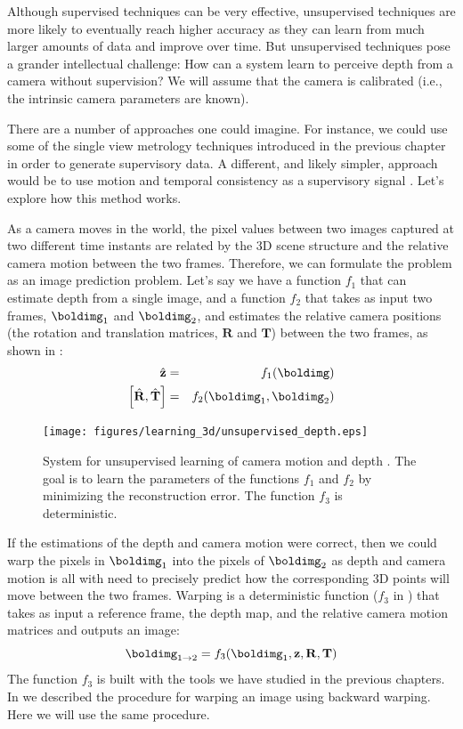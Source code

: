 Although supervised techniques can be very effective, unsupervised techniques are more likely to eventually reach higher accuracy as they can learn from much larger amounts of data and improve over time. But unsupervised techniques pose a grander intellectual challenge: How can a system learn to perceive depth from a camera without supervision? We will assume that the camera is calibrated (i.e., the intrinsic camera parameters are known).

There are a number of approaches one could imagine. For instance, we could use some of the single view metrology techniques introduced in the previous chapter in order to generate supervisory data. A different, and likely simpler, approach would be to use motion and temporal consistency as a supervisory signal \cite{Tinghui2017}. Let's explore how this method works. 

As a camera moves in the world, the pixel values between two images captured at two different time instants are related by the 3D scene structure and the relative camera motion between the two frames. Therefore, we can formulate the problem as an image prediction problem.
Let's say we have a function $f_1$ that can estimate depth from a single image, and a function $f_2$ that takes as input two frames, $\boldimg_1$ and $\boldimg_2$, and estimates the relative camera positions (the rotation and translation matrices, $\mathbf{R}$ and $\mathbf{T}$) between the two frames, as shown in \fig{\ref{fig:unsupervised_depth_system}}: 
\begin{eqnarray}
\hat{\mathbf{z}} &=& f_1(\boldimg) \\
\left[ \hat{\mathbf{R}},\hat{\mathbf{T}} \right] &=& f_2(\boldimg_1,\boldimg_2)
\end{eqnarray}

\begin{figure}[t]
\centerline{
\texttt{[image: figures/learning\_3d/unsupervised\_depth.eps]}
}
\caption{System for unsupervised learning of camera motion and depth \cite{Tinghui2017}. The goal is to learn the parameters of the functions $f_1$ and $f_2$ by minimizing the reconstruction error. The function $f_3$ is deterministic.}
\label{fig:unsupervised_depth_system}
\end{figure}


If the estimations of the depth and camera motion were correct, then we could warp the pixels in $\boldimg_1$ into the pixels of $\boldimg_2$ as depth and camera motion is all with need to precisely predict how the corresponding 3D points will move between the two frames. Warping is a deterministic function ($f_3$ in \fig{\ref{fig:unsupervised_depth_system}}) that takes as input a reference frame, the depth map, and the relative camera motion matrices and outputs an image: 
\begin{equation}
\boldimg_{1 \rightarrow 2} = 
f_3(\boldimg_1, \mathbf{z}, \mathbf{R}, \mathbf{T})
\end{equation}
The function $f_3$ is built with the tools we have studied in the previous chapters. 
In \sect{\ref{sect:image_warping}} we described the procedure for warping an image using backward warping. Here we will use the same procedure. 


